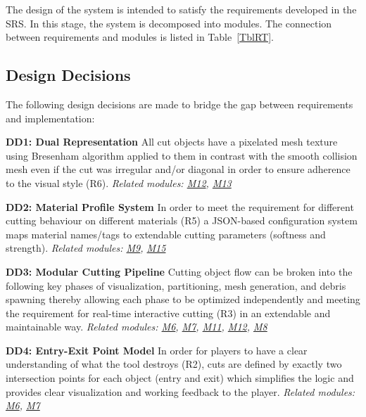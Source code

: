 \documentclass[12pt, titlepage]{article}
\begin{document}
The design of the system is intended to satisfy the requirements developed in the SRS.
In this stage, the system is decomposed into modules. The connection between requirements
and modules is listed in Table~\ref{TblRT}.

\subsection{Design Decisions}

The following design decisions are made to bridge the gap between requirements and implementation:

\vspace{5mm}
\noindent
\textbf{DD1: Dual Representation}
\newline
All cut objects have a pixelated mesh texture using
Bresenham algorithm applied to them in contrast with the smooth collision mesh even
if the cut was irregular and/or diagonal in order to ensure adherence to the visual style (R6).
\newline
\textit{Related modules: \hyperref[M12]{M12}, \hyperref[M13]{M13}}

\vspace{5mm}
\noindent
\textbf{DD2: Material Profile System} In order to meet the requirement for different cutting
behaviour on different materials (R5) a JSON-based configuration system maps material names/tags
to extendable cutting parameters (softness and strength).
\newline
\textit{Related modules: \hyperref[M9]{M9}, \hyperref[M15]{M15}}

\vspace{5mm}
\noindent
\textbf{DD3: Modular Cutting Pipeline}
\newline
Cutting object flow can be broken into the following key
phases of visualization, partitioning, mesh generation, and debris spawning thereby allowing
each phase to be optimized independently and meeting the requirement for real-time interactive
cutting (R3) in an extendable and maintainable way.
\newline
\textit{Related modules: \hyperref[M6]{M6}, \hyperref[M7]{M7}, \hyperref[M11]{M11}, \hyperref[M12]{M12}, \hyperref[M8]{M8}}

\vspace{5mm}
\noindent
\textbf{DD4: Entry-Exit Point Model}
\newline
In order for players to have a clear understanding of what
the tool destroys (R2), cuts are defined by exactly two intersection points for each object
(entry and exit) which simplifies the logic and provides clear visualization and working
feedback to the player.
\newline
\textit{Related modules: \hyperref[M6]{M6}, \hyperref[M7]{M7}}
\end{document}
